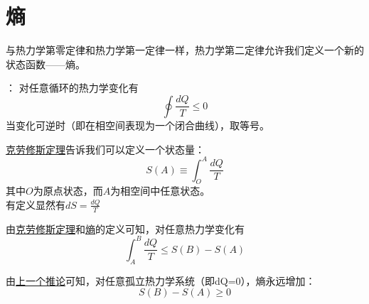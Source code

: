 \documentclass[12pt, a4paper, oneside]{ctexbook}
\newcommand{\hl}[1]{\hlbox{#1}}
\newcounter{#2}
\newcounter{#2}[#1]
\numberwithin{#2}{#1}
\begin{document}
          \section{熵}
          与热力学第零定律和热力学第一定律一样，热力学第二定律允许我们定义一个新的状态函数——熵。

          \begin{theorem}\label{thrm:Clausius}
            \hl{克劳修斯定理}：
            对任意循环的热力学变化有
            \begin{equation}
              \oint \frac{dQ}{T}\leqslant 0
            \end{equation}
            当变化可逆时（即在相空间表现为一个闭合曲线），取等号。
          \end{theorem}
          \begin{define}\label{def:entropy}
            \hyperref[thrm:Clausius]{克劳修斯定理}告诉我们可以定义一个状态量\hl{熵}：
            \begin{equation}
              S(A)\equiv \int_O^A\frac{dQ}{T}
            \end{equation}
            其中\(O\)为原点状态，而\(A\)为相空间中任意状态。\\
            有定义显然有\(dS=\frac{dQ}{T}\)
          \end{define}
          \begin{deduce}\label{ded:deduce141}
            由\hyperref[thrm:Clausius]{克劳修斯定理}和\hyperref[def:entropy]{熵}的定义可知，对任意热力学变化有
            \begin{equation}
              \int_A^B\frac{dQ}{T}\leqslant S(B)-S(A)
            \end{equation}
          \end{deduce}
          \begin{deduce}
            由\hyperref[ded:deduce141]{上一个推论}可知，对任意孤立热力学系统（即dQ=0），熵永远增加：
            \begin{equation}
              S(B)-S(A)\geqslant 0
            \end{equation}
          \end{deduce}
\end{document}
